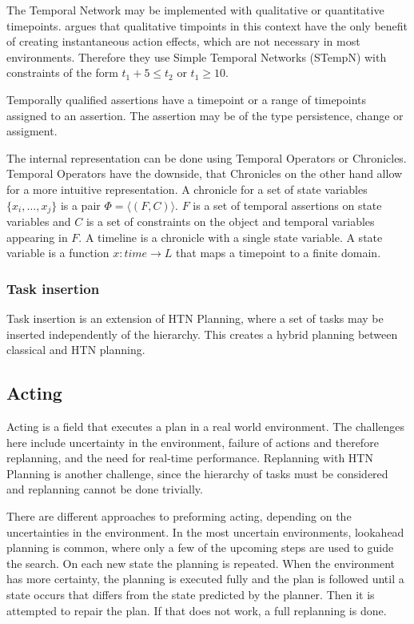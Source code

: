 The Temporal Network may be implemented with qualitative or quantitative timepoints.
\cite{bit-monnotTemporalHierarchicalModels2017} argues that qualitative timpoints in this context have the only benefit of creating instantaneous action effects, which are not necessary in most environments.
Therefore they use Simple Temporal Networks (STempN) with constraints of the form $t_1 + 5 \leq t_2$ or $t_1 \geq 10$.

Temporally qualified assertions have a timepoint or a range of timepoints assigned to an assertion.
The assertion may be of the type persistence, change or assigment.

The internal representation can be done using Temporal Operators or Chronicles.
Temporal Operators have the downside, that 
Chronicles on the other hand allow for a more intuitive representation.
A chronicle for a set of state variables $\{x_i,\dots,x_j\}$ is a pair $\Phi = \langle(F,C)\rangle$.
$F$ is a set of temporal assertions on state variables and $C$ is a set of constraints on the object and temporal variables appearing in $F$.
A timeline is a chronicle with a single state variable.
A state variable is a function $x : time \rightarrow L$ that maps a timepoint to a finite domain.

\subsubsection{Task insertion}

Task insertion is an extension of HTN Planning, where a set of tasks may be inserted independently of the hierarchy.
This creates a hybrid planning between classical and HTN planning.



\subsection{Acting}\label{sec:acting}

Acting is a field that executes a plan in a real world environment.
The challenges here include uncertainty in the environment, failure of actions and therefore replanning, and the need for real-time performance.
Replanning with HTN Planning is another challenge, since the hierarchy of tasks must be considered and replanning cannot be done trivially.

There are different approaches to preforming acting, depending on the uncertainties in the environment.
In the most uncertain environments, lookahead planning is common, where only a few of the upcoming steps are used to guide the search. 
On each new state the planning is repeated.
When the environment has more certainty, the planning is executed fully and the plan is followed until a state occurs that differs from the state predicted by the planner.
Then it is attempted to repair the plan. 
If that does not work, a full replanning is done.

